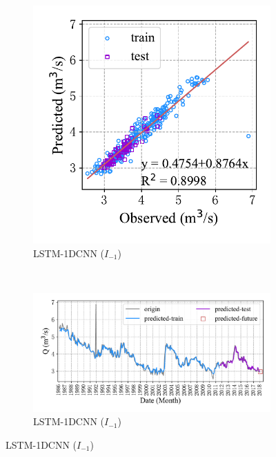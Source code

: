 \begin{figure}[!htbp]
  \centering
  \begin{subfigure}[b]{0.305\textwidth}
    \includegraphics[width=\textwidth]{Img/chap4_spr/spr_scatter_in_1_out_1_lstm_cnn.pdf}
    \vspace{-1.2cm}
    \caption{LSTM-1DCNN ($I_{-1}$)}
    \label{fig:spr_scatter_in_1_out_1_lstm_cnn}
  \end{subfigure}
  ~
  \begin{subfigure}[b]{0.615\textwidth}
    \includegraphics[width=\textwidth]{Img/chap4_spr/spr_series_in_1_out_1_lstm_cnn.pdf}
    \vspace{-1.2cm}
    \caption{LSTM-1DCNN ($I_{-1}$)}
    \label{fig:spr_series_in_1_out_1_lstm_cnn}

\end{subfigure}
\end{figure}
